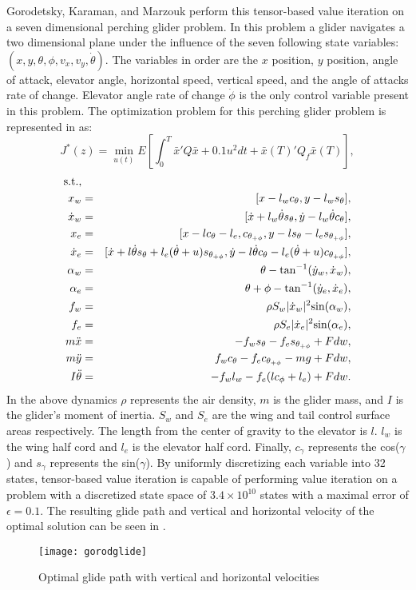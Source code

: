 Gorodetsky, Karaman, and Marzouk perform this tensor-based value iteration on a seven dimensional perching glider problem. In this problem a glider navigates a two dimensional plane under the influence of the seven following state variables: $(x,y,\theta,\phi,v_x,v_y,\dot{\theta})$. The variables in order are the $x$ position, $y$ position, angle of attack, elevator angle, horizontal speed, vertical speed, and the angle of attacks rate of change. Elevator angle rate of change $\dot{\phi}$ is the only control variable present in this problem. The optimization problem for this perching glider problem is represented in \cite{Gorod} as:
\begin{equation}\label{eqn9}
J^*(z)= \underset{u(t) }{\operatorname{min }}E[\int_{0}^{T}\bar{x}'Q\bar{x}+ 0.1u^2dt + \bar{x}(T)'Q_f\bar{x}(T) ],
\end{equation}
\begin{eqnarray*}
\textnormal{s.t.,} &&\\
x_w & = & [x-l_w c_{\theta},y-l_w s_\theta],\\
\dot{x}_w & = & [\dot{x}+l_w \dot{\theta}s_\theta,\dot{y}-l_w \dot{\theta} c_\theta],\\
x_e & = & [x-lc_{\theta}-l_e,c_{\theta_{+\phi}},y-ls_\theta - l_e s_{\theta_{+\phi}}],\\
\dot{x}_e & = & [\dot{x}+l\dot{\theta}s_{\theta}+l_e(\dot{\theta}+u)s_{\theta_{+\phi}},\dot{y}-l\dot{\theta}c_\theta - l_e (\dot{\theta}+u) c_{\theta_{+\phi}}],\\
\alpha_w &=& \theta - \textnormal{tan}^{-1}(\dot{y}_w,\dot{x}_w), \\
\alpha_e &=& \theta + \phi -  \textnormal{tan}^{-1}(\dot{y}_e,\dot{x}_e), \\
f_w &=& \rho S_w |\dot{x}_w|^2 \textnormal{sin}(\alpha_w), \\
f_e &=& \rho S_e |\dot{x}_e|^2 \textnormal{sin}(\alpha_e), \\
m\ddot{x} &=& -f_w s_\theta - f_e s_{\theta_{+\phi}}+ Fdw, \\
m\ddot{y} &=& f_w c_\theta - f_e c_{\theta_{+\phi}}-mg+ Fdw, \\
I\ddot{\theta} &=& -f_w l_w - f_e(lc_\phi +l_e) + Fdw.
\end{eqnarray*}
In the above dynamics $\rho$ represents the air density, $m$ is the glider mass, and $I$ is the glider's moment of inertia. $S_w$ and $S_e$ are the wing and tail control surface areas respectively. The length from the center of gravity to the elevator is $l$. $l_w$ is the wing half cord and $l_e$ is the elevator half cord. Finally, $c_\gamma$ represents the cos($\gamma$) and $s_\gamma$ represents the sin($\gamma$). By uniformly discretizing each variable into 32 states, tensor-based value iteration is capable of performing value iteration on a problem with a discretized state space of $ 3.4 \times 10^10$ states with a maximal error of $ \epsilon = 0.1$. The resulting glide path and vertical and horizontal velocity of the optimal solution can be seen in .
\begin{figure}
\centering
\texttt{[image: gorodglide]}
\caption{Optimal glide path with vertical and horizontal velocities \cite{gorod}}
\label{gorodglide}
\end{figure}

